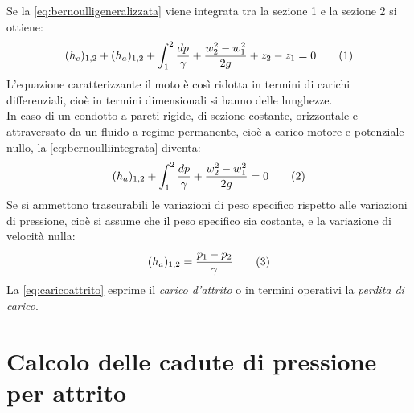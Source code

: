 Se la \eqref{eq:bernoulligeneralizzata} viene integrata tra la sezione 1 e la sezione 2 si ottiene:
\[(h_e)_{1,2}+(h_a)_{1,2}+\int^2_1{\frac{dp}{\gamma}}+\frac{w^2_2-w^2_1}{2g}+z_2-z_1=0\label{eq:bernoulliintegrata}\addtag\]
L'equazione caratterizzante il moto è così ridotta in termini di carichi differenziali, cioè in termini dimensionali si hanno delle lunghezze.\\
In caso di un condotto a pareti rigide, di sezione costante, orizzontale e attraversato da un fluido a regime permanente, cioè a carico motore e potenziale nullo, la \eqref{eq:bernoulliintegrata} diventa:
\[(h_a)_{1,2}+\int^2_1{\frac{dp}{\gamma}}+\frac{w^2_2-w^2_1}{2g}=0\label{eq:attritointermedio}\addtag\]
Se si ammettono trascurabili le variazioni di peso specifico rispetto alle variazioni di pressione, cioè si assume che il peso specifico sia costante, e la variazione di velocità nulla:
\[(h_a)_{1,2}=\frac{p_1-p_2}{\gamma}\label{eq:caricoattrito}\addtag\]
La \eqref{eq:caricoattrito} esprime il \textit{carico d'attrito} o in termini operativi la \textit{perdita di carico}. 
\section{Calcolo delle cadute di pressione per attrito}
